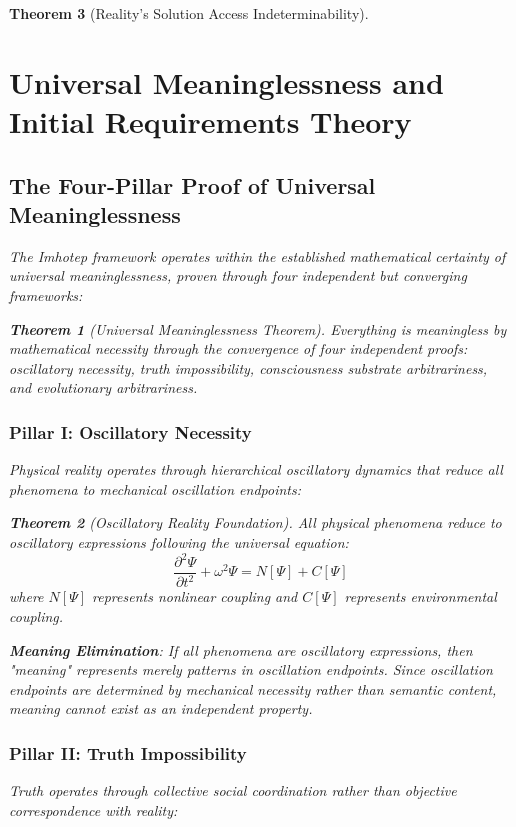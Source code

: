 \documentclass[12pt,a4paper]{article}
\newtheorem{theorem}{Theorem}[section]
\theoremstyle{remark}
\begin{document}
\begin{theorem}[Reality's Solution Access Indeterminability]
\section{Universal Meaninglessness and Initial Requirements Theory}

\subsection{The Four-Pillar Proof of Universal Meaninglessness}

The Imhotep framework operates within the established mathematical certainty of universal meaninglessness, proven through four independent but converging frameworks:

\begin{theorem}[Universal Meaninglessness Theorem]
Everything is meaningless by mathematical necessity through the convergence of four independent proofs: oscillatory necessity, truth impossibility, consciousness substrate arbitrariness, and evolutionary arbitrariness.
\end{theorem}

\subsubsection{Pillar I: Oscillatory Necessity}

Physical reality operates through hierarchical oscillatory dynamics that reduce all phenomena to mechanical oscillation endpoints:

\begin{theorem}[Oscillatory Reality Foundation]
All physical phenomena reduce to oscillatory expressions following the universal equation:
$$\frac{\partial^2\Psi}{\partial t^2} + \omega^2\Psi = N[\Psi] + C[\Psi]$$
where $N[\Psi]$ represents nonlinear coupling and $C[\Psi]$ represents environmental coupling.
\end{theorem}

\textbf{Meaning Elimination}: If all phenomena are oscillatory expressions, then "meaning" represents merely patterns in oscillation endpoints. Since oscillation endpoints are determined by mechanical necessity rather than semantic content, meaning cannot exist as an independent property.

\subsubsection{Pillar II: Truth Impossibility} 

Truth operates through collective social coordination rather than objective correspondence with reality:


\end{theorem}
\end{document}
